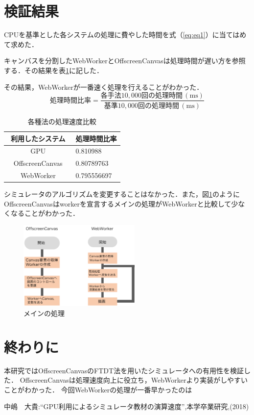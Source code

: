 \documentclass[twocolumn,10pt,a4j]{jsarticle}
\begin{document}
\section{検証結果}
CPUを基準とした各システムの処理に費やした時間を式（\ref{eq:eq1}）に当てはめて求めた．

キャンバスを分割したWebWorkerとOffscreenCanvasは処理時間が遅い方を参照する．その結果を表\ref{tab:tab2}に記した．

その結果，WebWorkerが一番速く処理を行えることがわかった．
\begin{equation}
 処理時間比率 = \frac { 各手法10,000回の処理時間 \, \mathrm{(ms)}} { 基準10,000回の処理時間\, \mathrm{(ms)} } 
\label{eq:eq1}
\end{equation}


\begin{table} [h]
\centering
\caption{各種法の処理速度比較}
	\begin{tabular} {| c | l |} \hline
	利用したシステム　& 処理時間比率 \\ \hline
	GPU & 0.810988 \\ \hline
	OffscreenCanvas & 0.80789763 \\ \hline
	WebWorker & 0.795556697 \\ \hline
	\end{tabular} 
	\label{tab:tab2}
\end{table}
シミュレータのアルゴリズムを変更することはなかった．また，図\ref{fig:two}のようにOffscreenCanvasはworkerを宣言するメインの処理がWebWorkerと比較して少なくなることがわかった．
\begin{figure}[htbp]
  \begin{center}
   \includegraphics[width=60mm]{chart.pdf}
  \end{center}
  \caption{メインの処理}
  \label{fig:two}
\end{figure}

\section{終わりに}
本研究ではOffscreenCanvasのFTDT法を用いたシミュレータへの有用性を検証した．
OffscreenCanvasは処理速度向上に役立ち，WebWorkerより実装がしやすいことがわかった．
今回WebWorkerの処理が一番早かったのは
\begin{thebibliography}{99}

	中嶋　大貴:``GPU利用によるシミュレータ教材の演算速度'',本学卒業研究,(2018)
\end{thebibliography}
\end{document}
